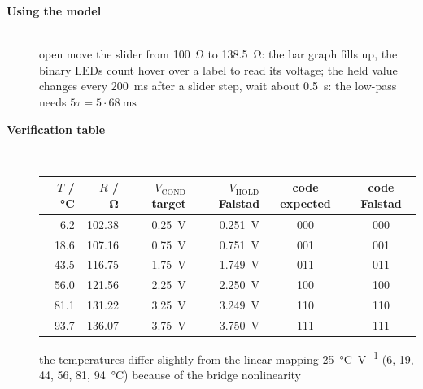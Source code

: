\begin{description}
\item[{\rot\bf Using the model}]~\\[-\lblskip]
\bi
	\ite open 
	\ite move the slider from \SI{100}{\ohm} to \SI{138.5}{\ohm}: the bar graph fills up, the binary LEDs count
	\ite hover over a label to read its voltage; the held value changes every \SI{200}{\milli\second}
	\ite after a slider step, wait about \SI{0.5}{\second}: the low-pass needs $5\tau = 5\cdot\SI{68}{\milli\second}$
\ei
\os{\newpage}

\item[{\rot\bf Verification table}]~\\[-\lblskip]
\begin{center}
\begin{tabular}{rrrrcc}
\toprule
$T$ / \si{\celsius} & $R$ / \si{\ohm} & $V_\mathrm{COND}$ target & $V_\mathrm{HOLD}$ Falstad & code expected & code Falstad \\
\midrule
 6.2 & 102.38 & \SI{0.25}{\volt} & \SI{0.251}{\volt} & 000 & 000 \\
18.6 & 107.16 & \SI{0.75}{\volt} & \SI{0.751}{\volt} & 001 & 001 \\
43.5 & 116.75 & \SI{1.75}{\volt} & \SI{1.749}{\volt} & 011 & 011 \\
56.0 & 121.56 & \SI{2.25}{\volt} & \SI{2.250}{\volt} & 100 & 100 \\
81.1 & 131.22 & \SI{3.25}{\volt} & \SI{3.249}{\volt} & 110 & 110 \\
93.7 & 136.07 & \SI{3.75}{\volt} & \SI{3.750}{\volt} & 111 & 111 \\
\bottomrule
\end{tabular}
\end{center}
\bi
	\ite the temperatures differ slightly from the linear mapping \SI{25}{\celsius\per\volt} (6, 19, 44, 56, 81, \SI{94}{\celsius}) because of the bridge nonlinearity
\ei
\os{\newpage}


\end{description}
